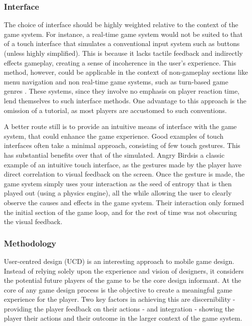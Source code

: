 \documentclass[final]{cmpreport}
\begin{document}
\subsubsection{Interface}
The choice of interface should be highly weighted relative to the context of the game system. For instance, a real-time game system would not be suited to that of a touch interface that simulates a conventional input system such as buttons (unless highly simplified). This is because it lacks tactile feedback and indirectly effects gameplay, creating a sense of incoherence in the user's experience. This method, however, could be applicable in the context of non-gameplay sections like menu navigation and non real-time game systems, such as turn-based game genres \citep{XuBradburn}. These systems, since they  involve no emphasis on player reaction time, lend themselves to such interface methods. One advantage to this approach is the omission of a tutorial, as most players are accustomed to such conventions.

A better route still is to provide an intuitive means of interface with the game system, that could enhance the game experience. Good examples of touch interfaces often take a minimal approach, consisting of few touch gestures. This has substantial benefits over that of the simulated. Angry Birds\footnotemark[2] is a classic example of an intuitive touch interface, as the gestures made by the player have direct correlation to visual feedback on the screen. Once the gesture is made, the game system simply uses your interaction as the seed of entropy that is then played out (using a physics engine), all the while allowing the user to clearly observe the causes and effects in the game system. Their interaction only formed the initial section of the game loop, and for the rest of time was not obscuring the visual feedback.


\subsubsection{Methodology}
User-centred design (UCD) is an interesting approach to mobile game design. Instead of relying solely upon the experience and vision of designers, it considers the potential future players of the game to be the core design informant. At the core of any game design process is the objective to create a meaningful game experience for the player. Two key factors in achieving this are discernibility - providing the player feedback on their actions - and integration - showing the player their actions and their outcome in the larger context of the game system.
\end{document}
